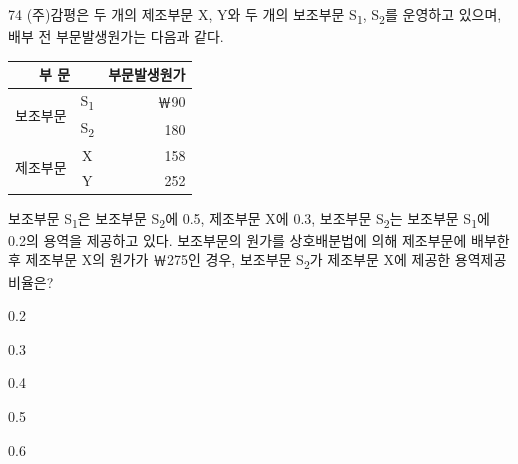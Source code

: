 \begin{question}{74}
(주)감평은 두 개의 제조부문 X, Y와 두 개의 보조부문 S\textsubscript{1}, S\textsubscript{2}를 운영하고 있으며, 배부 전 부문발생원가는 다음과 같다.
\par{\small\centering\begin{tabular}{|c|c|r|}\hline
\multicolumn{2}{|c|}{부 문} & 부문발생원가 \\ \hline
\multirow{2}{*}{보조부문} & S\textsubscript{1} & ￦90 \\ \cline{2-3}
 & S\textsubscript{2} & 180 \\ \hline
\multirow{2}{*}{제조부문} & X & 158 \\ \cline{2-3}
 & Y & 252 \\ \hline
\end{tabular}\par}
보조부문 S\textsubscript{1}은 보조부문 S\textsubscript{2}에 0.5, 제조부문 X에 0.3, 보조부문 S\textsubscript{2}는 보조부문 S\textsubscript{1}에 0.2의 용역을 제공하고 있다. 보조부문의 원가를 상호배분법에 의해 제조부문에 배부한 후 제조부문 X의 원가가 ￦275인 경우, 보조부문 S\textsubscript{2}가 제조부문 X에 제공한 용역제공비율은?
\begin{choices}
  \item 0.2
  \item 0.3
  \item 0.4
  \item 0.5
  \item 0.6
\end{choices}
\end{question}
